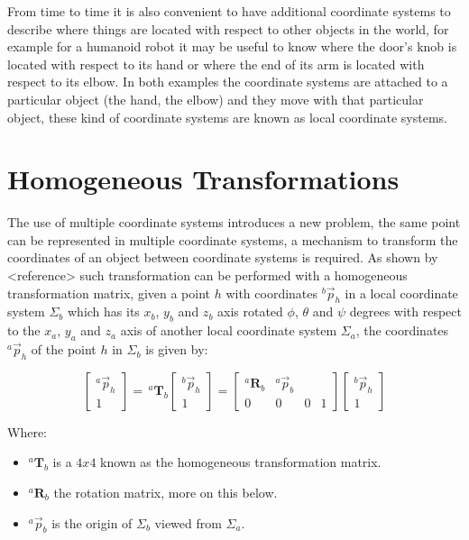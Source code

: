 \documentclass[a4paper]{report}
\begin{document}
From time to time it is also convenient to have additional coordinate systems to
describe where things are located with respect to other objects in the world, for
example for a humanoid robot it may be useful to know where the door's knob is
located with respect to its hand or where the end of its arm is located with
respect to its elbow. In both examples the coordinate systems are attached to
a particular object (the hand, the elbow) and they move with that particular
object, these kind of coordinate systems are known as local coordinate systems.


\section{Homogeneous Transformations}
The use of multiple coordinate systems introduces a new problem, the same point
can be represented in multiple coordinate systems, a mechanism to transform the
coordinates of an object between coordinate systems is required. As shown by
<reference> such transformation can be performed with a homogeneous
transformation matrix, given a point $h$ with coordinates $^{b}\vec{p}_{h}$ in
a local coordinate system $\Sigma_b$ which has its $x_b$, $y_b$ and $z_b$ axis
rotated $\phi$, $\theta$ and $\psi$ degrees with respect to the $x_a$, $y_a$
and $z_a$ axis of another local coordinate system $\Sigma_{a}$, the coordinates
$^{a}\vec{p}_{h}$ of the point $h$ in $\Sigma_b$ is given by:

\begin{equation}
    \begin{bmatrix} ^{a}\vec{p}_{h} \\ 1 \end{bmatrix} = \,
        ^{a}\boldsymbol{T}_{b}
        \begin{bmatrix}
            ^{b}\vec{p}_{h} \\ 1
        \end{bmatrix} =
        \begin{bmatrix}
            ^{a}\boldsymbol{R}_{b} & ^{a}\vec{p}_{b} \\
            0 & 0 & 0 & 1
        \end{bmatrix}
        \begin{bmatrix}
            ^{b}\vec{p}_{h} \\
            1
        \end{bmatrix}
\end{equation}

Where:
\begin{itemize}
    \item{} $^{a}\boldsymbol{T}_{b}$ is a $4x4$ known as the homogeneous transformation matrix.
    \item{} $^{a}\boldsymbol{R}_{b}$ the rotation matrix, more on this below.
    \item{} $^{a}\vec{p}_{b}$ is the origin of $\Sigma_{b}$ viewed from $\Sigma_{a}$.
\end{itemize}
\end{document}
